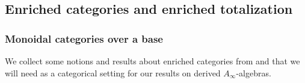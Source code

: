 \documentclass[twoside]{article}
\begin{document}
\subsection{Enriched categories and enriched totalization}
\subsubsection{Monoidal categories over  a base}




We collect some notions and results about enriched categories from \cite{riehl} and \cite[\S 4.2]{whitehouse} that we will need as a categorical setting for our results on derived $A_\infty$-algebras.
\end{document}
